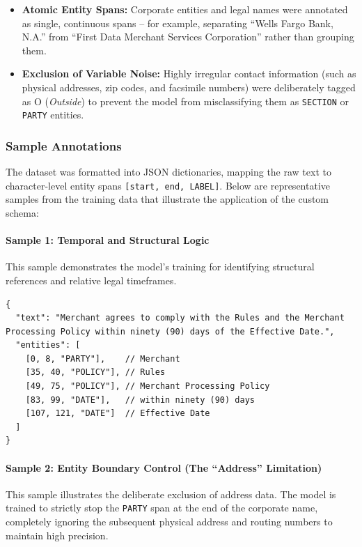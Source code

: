 \documentclass[twoside,final]{hcmut-report}
\begin{document}
\begin{itemize}[topsep=0pt, parsep=0pt, itemsep=0pt]
  \item \textbf{Atomic Entity Spans:} Corporate entities and legal names were annotated as single, continuous spans -- for example, separating ``Wells Fargo Bank, N.A.'' from ``First Data Merchant Services Corporation'' rather than grouping them.
  \item \textbf{Exclusion of Variable Noise:} Highly irregular contact information (such as physical addresses, zip codes, and facsimile numbers) were deliberately tagged as O (\textit{Outside}) to prevent the model from misclassifying them as \texttt{SECTION} or \texttt{PARTY} entities.
\end{itemize}

\subsubsection{Sample Annotations}
The dataset was formatted into JSON dictionaries, mapping the raw text to character-level entity spans \texttt{[start, end, LABEL]}. Below are representative samples from the training data that illustrate the application of the custom schema:

\paragraph{Sample 1: Temporal and Structural Logic}
This sample demonstrates the model's training for identifying structural references and relative legal timeframes.
\begin{verbatim}
{
  "text": "Merchant agrees to comply with the Rules and the Merchant Processing Policy within ninety (90) days of the Effective Date.",
  "entities": [
    [0, 8, "PARTY"],    // Merchant
    [35, 40, "POLICY"], // Rules
    [49, 75, "POLICY"], // Merchant Processing Policy
    [83, 99, "DATE"],   // within ninety (90) days
    [107, 121, "DATE"]  // Effective Date
  ]
}
\end{verbatim}

\paragraph{Sample 2: Entity Boundary Control (The ``Address'' Limitation)}
This sample illustrates the deliberate exclusion of address data. The model is trained to strictly stop the \texttt{PARTY} span at the end of the corporate name, completely ignoring the subsequent physical address and routing numbers to maintain high precision.
\end{document}
